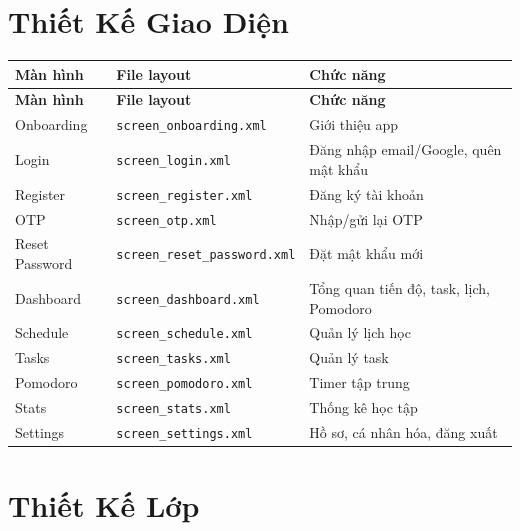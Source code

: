 \documentclass[12pt,a4paper]{report}
\begin{document}
\section{Thiết Kế Giao Diện}

\begin{longtable}{|>{\raggedright\arraybackslash}p{}|>{\raggedright\arraybackslash}p{}|>{\raggedright\arraybackslash}p{}|}
\hline
\textbf{Màn hình} & \textbf{File layout} & \textbf{Chức năng} \\ \hline
\endfirsthead
\hline
\textbf{Màn hình} & \textbf{File layout} & \textbf{Chức năng} \\ \hline
\endhead
Onboarding & \texttt{screen\_onboarding.xml} & Giới thiệu app \\ \hline
Login & \texttt{screen\_login.xml} & Đăng nhập email/Google, quên mật khẩu \\ \hline
Register & \texttt{screen\_register.xml} & Đăng ký tài khoản \\ \hline
OTP & \texttt{screen\_otp.xml} & Nhập/gửi lại OTP \\ \hline
Reset Password & \texttt{screen\_reset\_password.xml} & Đặt mật khẩu mới \\ \hline
Dashboard & \texttt{screen\_dashboard.xml} & Tổng quan tiến độ, task, lịch, Pomodoro \\ \hline
Schedule & \texttt{screen\_schedule.xml} & Quản lý lịch học \\ \hline
Tasks & \texttt{screen\_tasks.xml} & Quản lý task \\ \hline
Pomodoro & \texttt{screen\_pomodoro.xml} & Timer tập trung \\ \hline
Stats & \texttt{screen\_stats.xml} & Thống kê học tập \\ \hline
Settings & \texttt{screen\_settings.xml} & Hồ sơ, cá nhân hóa, đăng xuất \\ \hline
\end{longtable}

\section{Thiết Kế Lớp}
\end{document}
